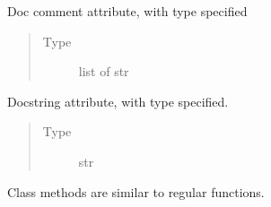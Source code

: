 \documentclass[letterpaper,10pt,english]{sphinxmanual}
\begin{document}
\begin{fulllineitems}
\begin{fulllineitems}
\end{fulllineitems}


\begin{fulllineitems}
\label{\detokenize{source/example:example.ExampleClass.attr4}}
\pysigstartsignatures
{}
\pysigstopsignatures
\sphinxAtStartPar
Doc comment  attribute, with type specified
\begin{quote}\begin{description}
\item[{Type}] \leavevmode
\sphinxAtStartPar
list of str

\end{description}\end{quote}

\end{fulllineitems}


\begin{fulllineitems}
\label{\detokenize{source/example:example.ExampleClass.attr5}}
\pysigstartsignatures
{}
\pysigstopsignatures
\sphinxAtStartPar
Docstring  attribute, with type specified.
\begin{quote}\begin{description}
\item[{Type}] \leavevmode
\sphinxAtStartPar
str

\end{description}\end{quote}

\end{fulllineitems}


\begin{fulllineitems}
\label{\detokenize{source/example:example.ExampleClass.example_method}}
\pysigstartsignatures
{}
\pysigstopsignatures
\sphinxAtStartPar
Class methods are similar to regular functions.


\end{fulllineitems}
\end{fulllineitems}
\end{document}
